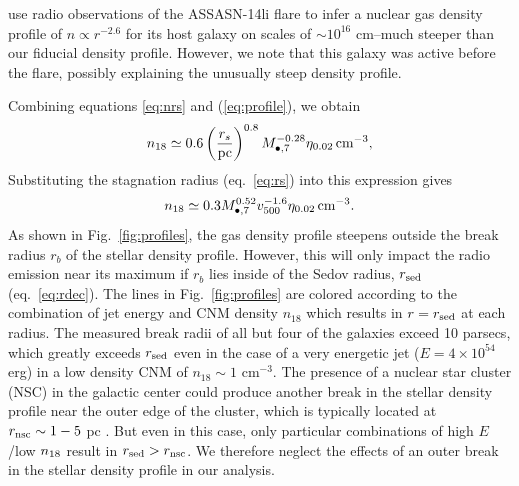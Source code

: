 \documentclass[usenatbib,fleqn]{mnras}
\newcommand{\Mbh}[1][]{M_{\bullet#1}}
\begin{document}
\citet{Alexander+2015} use radio observations of the ASSASN-14li flare
to infer a nuclear gas density profile of $n\propto r^{-2.6}$ for its
host galaxy on scales of $\sim 10^{16}$ cm--much steeper than
our fiducial density profile. However, we note that this galaxy was
active before the flare, possibly explaining the unusually steep
density profile.

Combining equations \eqref{eq:nrs} and (\ref{eq:profile}),
we obtain
\begin{equation}
  n_{18}\simeq 0.6 \left(\frac{r_s}{\rm pc}\right)^{0.8}
  \Mbh[,7]^{-0.28} \eta_{0.02} \, {\rm cm^{-3}},
  \label{eq:n18}
\end{equation}
%
Substituting the stagnation radius (eq.~\ref{eq:rs}) into this
expression gives
\begin{equation}
  n_{18}\simeq 0.3 \Mbh[,7]^{0.52} v_{500}^{-1.6} \eta_{0.02} \, {\rm
    cm^{-3}}.
\label{eq:n182}
\end{equation} 
%
As shown in Fig.~\ref{fig:profiles}, the gas density profile 
steepens outside the break radius $r_b$ of the stellar density
profile.  However, this will only impact the radio emission near its
maximum if $r_b$ lies inside of the Sedov radius, $r_{\rm sed}$
(eq.~\ref{eq:rdec}).  The lines in Fig.~\ref{fig:profiles} are colored
according to the combination of jet energy and CNM density $n_{18}$
which results in $r = r_{\rm sed}$ at each radius.  The measured break
radii of all but four of the \citet{Lauer+2007} galaxies exceed 10
parsecs, which greatly exceeds $r_{\rm sed}$ even in the case of a
very energetic jet ($E=4\times 10^{54}$ erg) in a low density CNM of
$n_{18} \sim 1$ cm$^{-3}$.  The presence of a nuclear star cluster
(NSC) in the galactic center could produce another break in the
stellar density profile near the outer edge of the cluster, which is
typically located at $r_{\rm nsc} \sim 1-5$ pc \citep{Georgiev+2014}.
But even in this case, only particular combinations of high $E$/low
$n_{\rm 18}$ result in $r_{\rm sed} > r_{\rm nsc}$.  We therefore
neglect the effects of an outer break in the stellar density profile
in our analysis.
\end{document}
